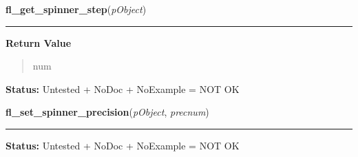     \vspace{0.5ex}

\hspace{.8\funcindent}\begin{boxedminipage}{\funcwidth}

    \raggedright \textbf{fl\_get\_spinner\_step}(\textit{pObject})

    \vspace{-1.5ex}

    \rule{\textwidth}{0.5\fboxrule}
\setlength{\parskip}{2ex}
\setlength{\parskip}{1ex}
      \textbf{Return Value}
    \vspace{-1ex}

      \begin{quote}
      num

      \end{quote}

\textbf{Status:} Untested + NoDoc + NoExample = NOT OK



    \end{boxedminipage}

    \label{xformslib:library:fl_set_spinner_precision}

    \vspace{0.5ex}

\hspace{.8\funcindent}\begin{boxedminipage}{\funcwidth}

    \raggedright \textbf{fl\_set\_spinner\_precision}(\textit{pObject}, \textit{precnum})

    \vspace{-1.5ex}

    \rule{\textwidth}{0.5\fboxrule}
\setlength{\parskip}{2ex}
\setlength{\parskip}{1ex}
\textbf{Status:} Untested + NoDoc + NoExample = NOT OK



    \end{boxedminipage}

    \label{xformslib:library:fl_get_spinner_precision}

    \vspace{0.5ex}

